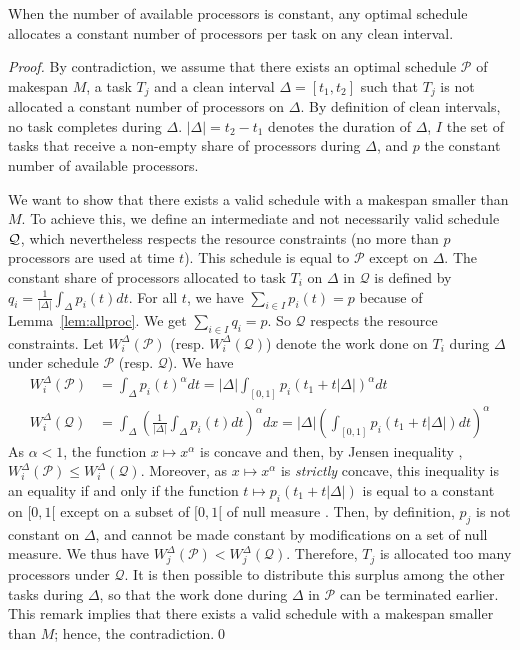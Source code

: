 \documentclass{llncs}
\newcommand{\T}{\Delta}
\begin{document}
\begin{lemma}
  \label{lem:esc}
  When the number of available processors is constant, any optimal schedule
  allocates a constant number of processors per task on any clean
  interval.
\end{lemma}




\begin{proof}
  By contradiction, we assume that there exists an optimal schedule
  $\mathcal{P}$ of makespan $M$, a task $T_j$ and a clean interval
  $\T=[t_1,t_2]$ such that $T_j$ is not allocated a constant number of
  processors on $\T$. By definition of clean intervals, no task
  completes during $\T$. $|\T|=t_2-t_1$ denotes the duration of $\T$,
  $I$ the set of tasks that receive a non-empty share of processors
  during $\T$, and $p$ the constant number of available processors.
	




  We want to show that there exists a valid schedule with a makespan
  smaller than $M$. To achieve this, we define an intermediate and
  not necessarily valid schedule $\mathcal{Q}$, which
  nevertheless respects the resource constraints (no more than
  $p$ processors are used at time $t$). This schedule is
  equal to $\mathcal{P}$ except on $\T$.
The constant share of processors allocated to task $T_i$ on $\T$ in
  $\mathcal{Q}$ is defined by $q_i = \frac{1}{|\T|}\int_\T
  p_i(t)dt$.  For all $t$, we have $\sum_{i\in I} p_i(t) = p$ because
  of Lemma~\ref{lem:allproc}. We get $\sum_{i\in I} q_i = p$. So
  $\mathcal{Q}$ respects the resource constraints.
  Let $W_i^\T(\mathcal{P})$ (resp. $W_i^\T(\mathcal{Q})$) denote the
  work done on $T_i$ during $\T$ under schedule $\mathcal{P}$
  (resp. $\mathcal{Q}$).
    We have 
  \begin{align*}	
    W_i^\T(\mathcal{P}) &= \int_\T p_i(t)^\alpha dt = |\T|
    \int_{[0,1]}  p_i(t_1+ t |\T|)^\alpha dt\\
W_i^\T(\mathcal{Q}) &= \int_\T  \left(\frac{1}{|\T|}\int_\T p_i(t) dt\right) ^\alpha dx
    =  |\T| \left(\int_{[0,1]} p_i(t_1+t |\T|) dt\right) ^\alpha
  \end{align*}
  As $\alpha<1$, the function $x\mapsto x^\alpha$ is concave and then,
  by Jensen inequality \cite{Hardy}, $W_i^\T(\mathcal{P}) \leq
  W_i^\T(\mathcal{Q})$.  Moreover, as $x\mapsto x^\alpha$ is
  \emph{strictly} concave, this inequality is an equality if and only
  if the function $t\mapsto p_i(t_1+t|\T|)$ is equal to a constant on
  $[0,1[$ except on a subset of $[0,1[$ of null measure \cite{Hardy}.
  Then, by definition, $p_j$ is not constant on $\Delta$, and
  cannot be made constant by modifications on a set of null measure.
  We thus have $W_j^\T(\mathcal{P}) < W_j^\T(\mathcal{Q})$.
Therefore, $T_j$ is allocated too many processors under
  $\mathcal{Q}$.  It is then possible to distribute this surplus among
  the other tasks during $\T$, so that the work done during $\T$ in
  $\mathcal{P}$ can be terminated earlier. This remark implies that
  there exists a valid schedule with a makespan smaller than $M$;
  hence, the contradiction.\qed
\end{proof}
\end{document}
